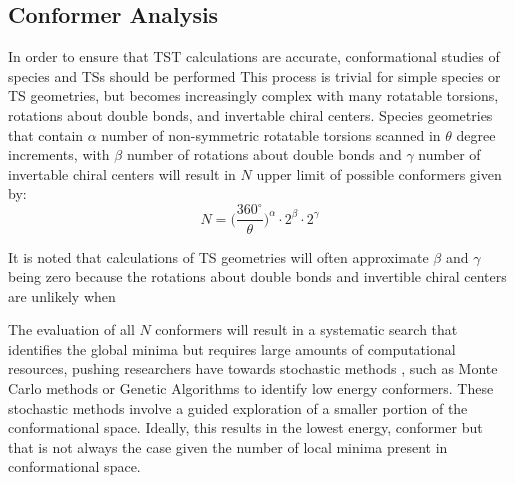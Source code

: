 \documentclass[preprint, 11pt]{elsarticle} %
\begin{document}

\subsection{Conformer Analysis}

In order to ensure that TST calculations are accurate, conformational studies of species and TSs should be performed 
This process is trivial for simple species or TS geometries, but becomes increasingly complex with many rotatable torsions, rotations about double bonds, and invertable chiral centers. 
Species geometries that contain $\alpha$ number of non-symmetric rotatable torsions scanned in $\theta$ degree increments, with $\beta$ number of rotations about double bonds and $\gamma$ number of invertable chiral centers will result in $N$ upper limit of possible conformers given by: 
\begin{equation}
    N = \Big(\frac{360^\circ}{\theta}\Big)^{\alpha} \cdot 2^{\beta} \cdot 2^{\gamma}
    \label{eq:confs}
\end{equation}


It is noted that calculations of TS geometries will often approximate $\beta$ and $\gamma$ being zero because the rotations about double bonds and invertible chiral centers are unlikely when 

The evaluation of all $N$ conformers will result in a systematic search that identifies the global minima but requires large amounts of computational resources, pushing researchers have towards stochastic methods \cite{Ebejer:2012}, such as Monte Carlo methods or Genetic Algorithms to identify low energy conformers. 
These stochastic methods involve a guided exploration of a smaller portion of the conformational space.
Ideally, this results in the lowest energy, conformer but that is not always the case given the number of local minima present in conformational space.
\end{document}
